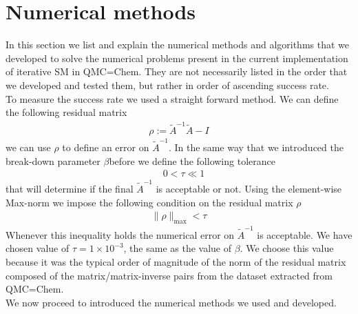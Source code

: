\documentclass[11pt]{article}
\numberwithin{figure}{section}
\numberwithin{table}{section}
\begin{document}
		
  \section{Numerical methods}\label{sec:num_opt}
		
		In this section we list and explain the numerical methods and algorithms that we developed to solve the numerical problems present in the current implementation of iterative SM in QMC=Chem. They are not necessarily listed in the order that we developed and tested them, but rather in order of ascending success rate.\\
		
		To measure the success rate we used a straight forward method. We can define the following residual matrix
			\begin{align} \label{cond:singular}
				\rho := \widetilde{A}^{-1}\widetilde{A} - I
			\end{align}
			we can use $\rho$ to define an error on $\widetilde{A}^{-1}$. In the same way that we introduced the break-down parameter $\beta$before we define the following tolerance 
			\begin{align}\label{eqn:tolerance}
				\quad 0 < \tau \ll 1
			\end{align}
			that will determine if the final $\widetilde{A}^{-1}$ is acceptable or not. Using the element-wise Max-norm we impose the following condition on the residual matrix $\rho$
			\begin{align}\label{eqn:acceptance-condition}
				\|\rho\|_\mathrm{max} < \tau
			\end{align}
			Whenever this inequality holds the numerical error on $\widetilde{A}^{-1}$ is acceptable. We have chosen value of $\tau = 1\times 10^{-3}$, the same as the value of $\beta$. We choose this value because it was the typical order of magnitude of the norm of the residual matrix composed of the matrix/matrix-inverse pairs from the dataset extracted from QMC=Chem.\\
			
			We now proceed to introduced the numerical methods we used and developed.			
		
\end{document}
